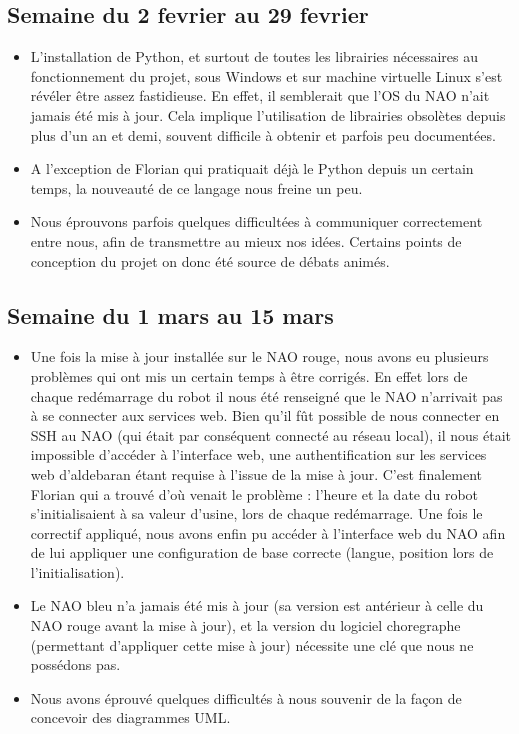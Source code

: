   \subsection{Semaine du 2 fevrier au 29 fevrier}
  \label{sub:Semaine du 2 fevrier au 29 fevrier}
    \begin{itemize}
      \item L'installation de Python, et surtout de toutes les librairies nécessaires au fonctionnement du projet, sous Windows et sur machine virtuelle Linux s'est révéler être assez fastidieuse.
      En effet, il semblerait que l'OS du NAO n'ait jamais été mis à jour. Cela implique l’utilisation de librairies obsolètes depuis plus d’un an et demi, souvent difficile à obtenir et parfois peu documentées.
      \item A l'exception de Florian qui pratiquait déjà le Python depuis un certain temps, la nouveauté de ce langage nous freine un peu.
      \item Nous éprouvons parfois quelques difficultées à communiquer correctement entre nous, afin de transmettre au mieux nos idées.
      Certains points de conception du projet on donc été source de débats animés.\\
    \end{itemize}



  \subsection{Semaine du 1 mars au 15 mars}
  \label{sub:Semaine du 1 mars au 15 mars}
    \begin{itemize}
      \item Une fois la mise à jour installée sur le NAO rouge, nous avons eu plusieurs problèmes qui ont mis un certain temps à être corrigés.
      En effet lors de chaque redémarrage du robot il nous été renseigné que le NAO n’arrivait pas à se connecter aux services web.
      Bien qu’il fût possible de nous connecter en SSH au NAO (qui était par conséquent connecté au réseau local),
      il nous était impossible d’accéder à l’interface web, une authentification sur les services web d’aldebaran étant requise à l’issue de la mise à jour.
      C’est finalement Florian qui a trouvé d’où venait le problème : l’heure et la date du robot s’initialisaient à sa valeur d’usine, lors de chaque redémarrage.
      Une fois le correctif appliqué, nous avons enfin pu accéder à l’interface web du NAO afin de
      lui appliquer une configuration de base correcte (langue, position lors de l’initialisation).
      \item Le NAO bleu n’a jamais été mis à jour (sa version est antérieur à celle du NAO rouge avant la mise à jour),
      et la version du logiciel choregraphe (permettant d’appliquer cette mise à jour) nécessite une clé que nous ne possédons pas.
      \item Nous avons éprouvé quelques difficultés à nous souvenir de la façon de concevoir des diagrammes UML.\\
    \end{itemize}



